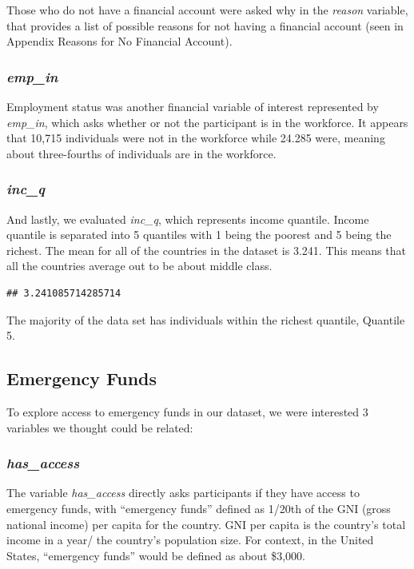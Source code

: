 \documentclass[water,article,submit,moreauthors,pdftex]{mdpi}
\begin{document}
Those who do not have a financial account were asked why in the
\emph{reason} variable, that provides a list of possible reasons for not
having a financial account (seen in Appendix Reasons for No Financial
Account).

\hypertarget{emp_in}{%
\subsubsection{\texorpdfstring{\emph{emp\_in}}{emp\_in}}\label{emp_in}}

Employment status was another financial variable of interest represented
by \emph{emp\_in}, which asks whether or not the participant is in the
workforce. It appears that 10,715 individuals were not in the workforce
while 24.285 were, meaning about three-fourths of individuals are in the
workforce.

\hypertarget{inc_q}{%
\subsubsection{\texorpdfstring{\emph{inc\_q}}{inc\_q}}\label{inc_q}}

And lastly, we evaluated \emph{inc\_q}, which represents income
quantile. Income quantile is separated into 5 quantiles with 1 being the
poorest and 5 being the richest. The mean for all of the countries in
the dataset is 3.241. This means that all the countries average out to
be about middle class.

\begin{verbatim}
## 3.241085714285714
\end{verbatim}

The majority of the data set has individuals within the richest
quantile, Quantile 5.

\hypertarget{emergency-funds}{%
\subsection{Emergency Funds}\label{emergency-funds}}

To explore access to emergency funds in our dataset, we were interested
3 variables we thought could be related:

\hypertarget{has_access}{%
\subsubsection{\texorpdfstring{\emph{has\_access}}{has\_access}}\label{has_access}}

The variable \emph{has\_access} directly asks participants if they have
access to emergency funds, with ``emergency funds'' defined as 1/20th of
the GNI (gross national income) per capita for the country. GNI per
capita is the country's total income in a year/ the country's population
size. For context, in the United States, ``emergency funds'' would be
defined as about \$3,000.
\end{document}
